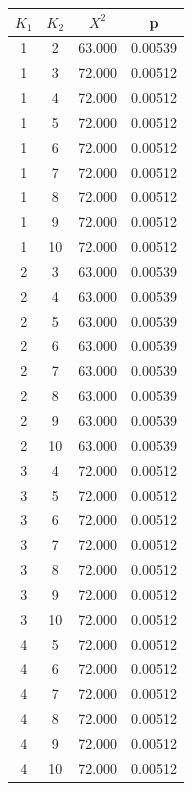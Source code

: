 \begin{table}

\begin{subtable}[tbp]{0.4\textwidth}
\centering
 
\begin{tabular}{|c|c|c|c|}\hline
 $K_1$ & $K_2$ & $X^2$ & p\\ \hline
 1 & 2 & 63.000 & 0.00539\\ \hline 
 1 & 3 & 72.000 & 0.00512\\ \hline 
 1 & 4 & 72.000 & 0.00512\\ \hline 
 1 & 5 & 72.000 & 0.00512\\ \hline 
 1 & 6 & 72.000 & 0.00512\\ \hline 
 1 & 7 & 72.000 & 0.00512\\ \hline 
 1 & 8 & 72.000 & 0.00512\\ \hline 
 1 & 9 & 72.000 & 0.00512\\ \hline 
 1 & 10 & 72.000 & 0.00512\\ \hline 
 2 & 3 & 63.000 & 0.00539\\ \hline 
 2 & 4 & 63.000 & 0.00539\\ \hline 
 2 & 5 & 63.000 & 0.00539\\ \hline 
 2 & 6 & 63.000 & 0.00539\\ \hline 
 2 & 7 & 63.000 & 0.00539\\ \hline 
 2 & 8 & 63.000 & 0.00539\\ \hline 
 2 & 9 & 63.000 & 0.00539\\ \hline 
 2 & 10 & 63.000 & 0.00539\\ \hline 
 3 & 4 & 72.000 & 0.00512\\ \hline 
 3 & 5 & 72.000 & 0.00512\\ \hline 
 3 & 6 & 72.000 & 0.00512\\ \hline 
 3 & 7 & 72.000 & 0.00512\\ \hline 
 3 & 8 & 72.000 & 0.00512\\ \hline 
 3 & 9 & 72.000 & 0.00512\\ \hline 
 3 & 10 & 72.000 & 0.00512\\ \hline 
 4 & 5 & 72.000 & 0.00512\\ \hline 
 4 & 6 & 72.000 & 0.00512\\ \hline 
 4 & 7 & 72.000 & 0.00512\\ \hline 
 4 & 8 & 72.000 & 0.00512\\ \hline 
 4 & 9 & 72.000 & 0.00512\\ \hline 
 4 & 10 & 72.000 & 0.00512\\ \hline 

\end{tabular}
\end{subtable}
\end{table}
